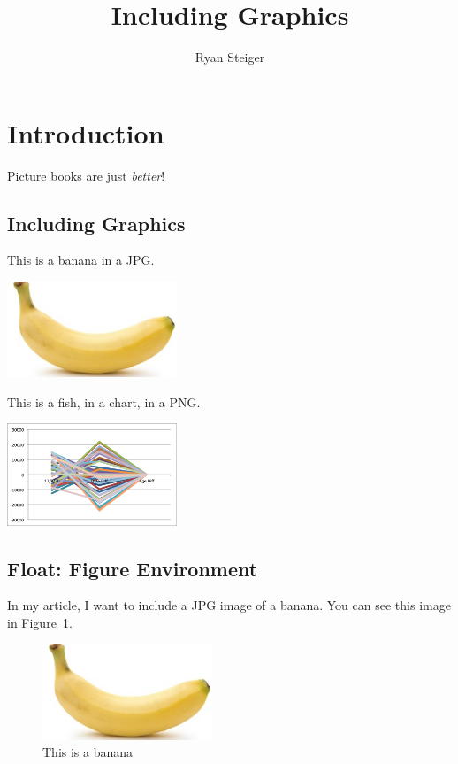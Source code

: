\documentclass{proc}
\title{Including Graphics}
\author{Ryan Steiger}
\date{}
\begin{document}
\maketitle

\section{Introduction}

Picture books are just \emph{better}!

\subsection{Including Graphics}

This is a banana in a JPG.

\includegraphics[width=2in]{banana.jpg}

This is a fish, in a chart, in a PNG.

\includegraphics[width=2in]{fish.png}

\subsection{Float: Figure Environment}

In my article, I want to include a JPG image of a banana. You can see this image in Figure~\ref{fig:banana}.

\begin{figure}[htbp]
  \begin{center}
    \includegraphics[width=2in]{banana.jpg}
    \caption{This is a banana}
    \label{fig:banana}
  \end{center}
\end{figure}
\end{document}
